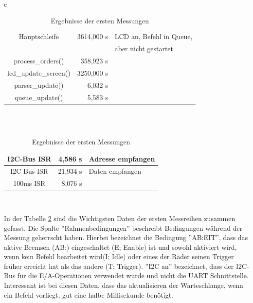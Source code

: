 \begin{table}[htb]
\begin{center}
\begin{tabular}{c}
\begin{tabularx}{\textwidth}{|c||r|X|}
		\hline
		Hauptschleife & 3614,000 \textmu{}s & LCD an, Befehl in Queue, \\
		& & aber nicht gestartet \\ \hline
		process\_orders() & 358,923 \textmu{}s &  \\ \hline
		lcd\_update\_screen() & 3250,000 \textmu{}s &  \\ \hline
		parser\_update() & 6,032 \textmu{}s &  \\ \hline
		queue\_update() & 5,583 \textmu{}s &  \\ \hline
	\end{tabularx} \\
	\\
	\begin{tabularx}{\textwidth}{|c||r|X|}
		\hline
		I2C-Bus ISR & 4,586 \textmu{}s & Adresse empfangen \\ \hline
		I2C-Bus ISR & 21,934 \textmu{}s & Daten empfangen \\ \hline
		100ms ISR & 8,076 \textmu{}s & \\ \hline
	\end{tabularx} \\
	\end{tabular}
	\caption{\label{erste_messung} Ergebnisse der ersten Messungen}
\end{center}
\end{table}
In der Tabelle \ref{erste_messung} sind die Wichtigsten Daten der ersten Messreihen zusammen
gefasst. Die Spalte ''Rahmenbedingungen'' beschreibt Bedingungen während der Messung geherrscht haben.
Hierbei bezeichnet die Bedingung ''AB:EIT'', dass das aktive Bremsen (AB:) eingeschaltet (E; Enable) ist und
sowohl aktiviert wird, wenn kein Befehl bearbeitet wird(I; Idle) oder eines der Räder seinen Trigger früher
erreicht hat als das andere (T; Trigger). ''I2C an'' bezeichnet, dass der I2C-Bus für die E/A-Operationen
verwendet wurde und nicht die UART Schnittstelle.\\
Interessant ist bei diesen Daten, dass das aktualisieren der Warteschlange, wenn ein Befehl vorliegt, gut
eine halbe Millisekunde benötigt.
